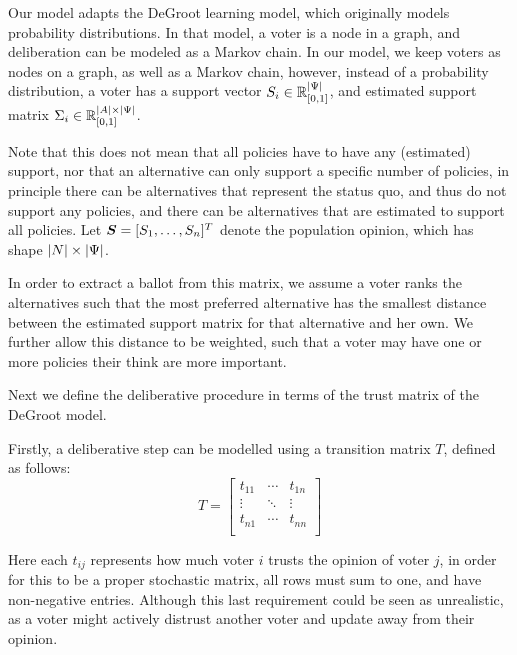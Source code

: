 Our model adapts the DeGroot learning model, which
originally models probability distributions. In that model, a voter is
a node in a graph, and deliberation can be modeled as a Markov chain. In our
model, we keep voters as nodes on a graph, as well as a Markov chain, however,
instead of a probability distribution, a voter has a support vector $S_i \in
	\mathbb{R}^{|\Psi|}_{[0,1]}$, and estimated support matrix $\Sigma_i\in
	\mathbb{R}^{|A| \times |\Psi|}_{[0,1]}$.

Note that this does not mean that all policies have to have any (estimated)
support, nor that an alternative can only support a specific number of
policies, in principle there can be alternatives that represent the status quo,
and thus do not support any policies, and there can be alternatives that are
estimated to support all policies.  Let $\boldsymbol{S}= [S_1, \dots,
	S_{n}]^{T}$ denote the population opinion, which has shape \(|N|
\times |\Psi|\).

In order to extract a ballot from this matrix, we assume a voter ranks the
alternatives such that the most preferred alternative has the smallest distance
between the estimated support matrix for that alternative and her own. We
further allow this distance to be weighted, such that a voter may have one or
more policies their think are more important. 


Next we define the deliberative procedure in terms of the trust matrix of the
DeGroot model.

Firstly, a deliberative step can be modelled using a transition matrix $T$,
defined as follows: \[ T=\begin{bmatrix} t_{11} & \cdots  & t_{1n} \\ \vdots &
\ddots & \vdots \\ t_{n1} & \cdots  & t_{nn} \\ \end{bmatrix} \]

Here each $t_{ij}$ represents how much voter $i$ trusts the opinion of voter
$j$, in order for this to be a proper stochastic matrix, all rows must sum to
one, and have non-negative entries. Although this last requirement could be
seen as unrealistic, as a voter might actively distrust another voter and
update away from their opinion.

